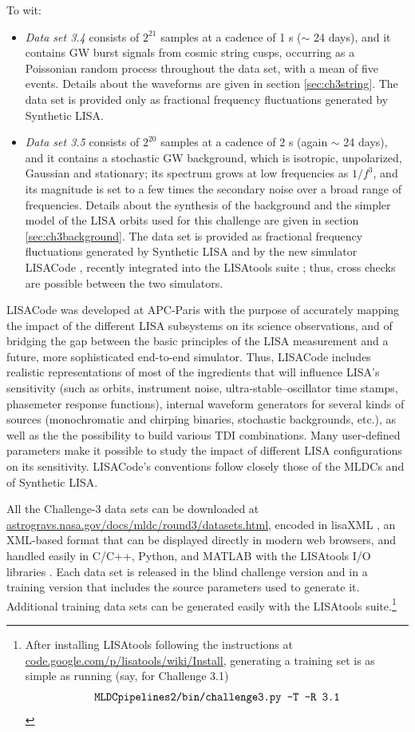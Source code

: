 \documentclass{iopart}
\begin{document}
To wit:
%
\begin{itemize}
%
\item \textit{Data set 3.4} consists of $2^{21}$ samples at a cadence of 1 s ($\sim$ 24 days), and it contains GW burst signals from cosmic string cusps, occurring as a Poissonian random process throughout the data set, with a mean of five events. Details about the waveforms are given in section \ref{sec:ch3string}. The data set is provided only as fractional frequency fluctuations generated by Synthetic LISA.
%
\item \textit{Data set 3.5} consists of $2^{20}$ samples at a cadence of 2 s (again $\sim$ 24 days), and it contains a stochastic GW background, which is isotropic, unpolarized, Gaussian and stationary; its spectrum grows at low frequencies as $1/f^3$, and its magnitude is set to a few times the secondary noise over a broad range of frequencies. Details about the synthesis of the background and the simpler model of the LISA orbits used for this challenge are given in section \ref{sec:ch3background}. The data set is provided as fractional frequency fluctuations generated by Synthetic LISA and by the new simulator LISACode \cite{lisacode}, recently integrated into the LISAtools suite \cite{lisatools}; thus, cross checks are possible between the two simulators.
%
\end{itemize}
%
LISACode \cite{lisacode} was developed at APC-Paris with the purpose of accurately mapping the impact of the different LISA subsystems on its science observations, and of bridging the gap between the basic principles of the LISA measurement and a future, more sophisticated end-to-end simulator. Thus, LISACode includes realistic representations of most of the ingredients that will influence LISA's sensitivity (such as orbits, instrument noise, ultra-stable--oscillator time stamps, phasemeter response functions), internal waveform generators for several kinds of sources (monochromatic and chirping binaries, stochastic backgrounds, etc.), as well as the the possibility to build various TDI combinations.
Many user-defined parameters make it possible to study the impact of different LISA configurations on its sensitivity. LISACode's conventions follow closely those of the MLDCs and of Synthetic LISA.

All the Challenge-3 data sets can be downloaded at \url{astrogravs.nasa.gov/docs/mldc/round3/datasets.html}, encoded in lisaXML \cite{mldclisasymp}, an XML-based format that can be displayed directly in modern web browsers, and handled easily in C/C++, Python, and MATLAB with the LISAtools I/O libraries \cite{lisatools}. Each data set is released in the blind challenge version and in a training version that includes the source parameters used to generate it. Additional training data sets can be generated easily with the LISAtools suite.\footnote{After installing LISAtools following the instructions at \url{code.google.com/p/lisatools/wiki/Install}, generating a training set is as simple as running (say, for Challenge 3.1) 
\begin{displaymath}
\mbox{\texttt{MLDCpipelines2/bin/challenge3.py -T -R 3.1}}
\end{displaymath}}
\end{document}
